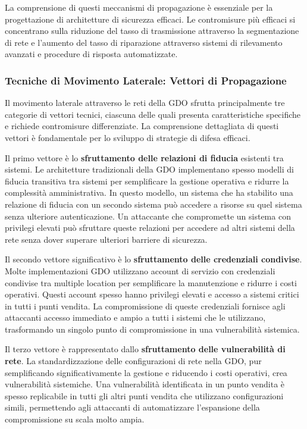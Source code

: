 \documentclass[12pt,a4paper,oneside]{book}
\begin{document}
La comprensione di questi meccanismi di propagazione è essenziale per la progettazione di architetture di sicurezza efficaci. Le contromisure più efficaci si concentrano sulla riduzione del tasso di trasmissione attraverso la segmentazione di rete e l'aumento del tasso di riparazione attraverso sistemi di rilevamento avanzati e procedure di risposta automatizzate.

\subsubsection{Tecniche di Movimento Laterale: Vettori di Propagazione}

Il movimento laterale attraverso le reti della GDO sfrutta principalmente tre categorie di vettori tecnici, ciascuna delle quali presenta caratteristiche specifiche e richiede contromisure differenziate. La comprensione dettagliata di questi vettori è fondamentale per lo sviluppo di strategie di difesa efficaci.

Il primo vettore è lo \textbf{sfruttamento delle relazioni di fiducia} esistenti tra sistemi. Le architetture tradizionali della GDO implementano spesso modelli di fiducia transitiva tra sistemi per semplificare la gestione operativa e ridurre la complessità amministrativa. In questo modello, un sistema che ha stabilito una relazione di fiducia con un secondo sistema può accedere a risorse su quel sistema senza ulteriore autenticazione. Un attaccante che compromette un sistema con privilegi elevati può sfruttare queste relazioni per accedere ad altri sistemi della rete senza dover superare ulteriori barriere di sicurezza.

Il secondo vettore significativo è lo \textbf{sfruttamento delle credenziali condivise}. Molte implementazioni GDO utilizzano account di servizio con credenziali condivise tra multiple location per semplificare la manutenzione e ridurre i costi operativi. Questi account spesso hanno privilegi elevati e accesso a sistemi critici in tutti i punti vendita. La compromissione di queste credenziali fornisce agli attaccanti accesso immediato e ampio a tutti i sistemi che le utilizzano, trasformando un singolo punto di compromissione in una vulnerabilità sistemica.

Il terzo vettore è rappresentato dallo \textbf{sfruttamento delle vulnerabilità di rete}. La standardizzazione delle configurazioni di rete nella GDO, pur semplificando significativamente la gestione e riducendo i costi operativi, crea vulnerabilità sistemiche. Una vulnerabilità identificata in un punto vendita è spesso replicabile in tutti gli altri punti vendita che utilizzano configurazioni simili, permettendo agli attaccanti di automatizzare l'espansione della compromissione su scala molto ampia.
\end{document}
